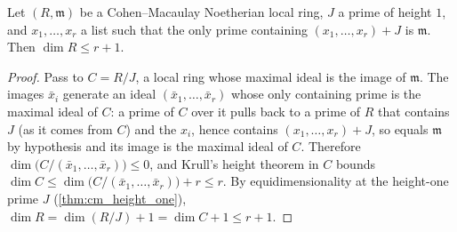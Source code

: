 \begin{theorem}
  \label{thm:krull_codim_count}
  \leanok
  Let \((R, \mathfrak m)\) be a Cohen--Macaulay Noetherian local ring, \(J\) a
  prime of height \(1\), and \(x_1, \dots, x_r\) a list such that the only prime
  containing \((x_1, \dots, x_r) + J\) is \(\mathfrak m\). Then
  \(\dim R \le r + 1\).
\end{theorem}
\begin{proof}
  \leanok
  Pass to \(C = R/J\), a local ring whose maximal ideal is the image of
  \(\mathfrak m\). The images \(\bar x_i\) generate an ideal
  \((\bar x_1, \dots, \bar x_r)\) whose only containing prime is the maximal
  ideal of \(C\): a prime of \(C\) over it pulls back to a prime of \(R\) that
  contains \(J\) (as it comes from \(C\)) and the \(x_i\), hence contains
  \((x_1, \dots, x_r) + J\), so equals \(\mathfrak m\) by hypothesis and its
  image is the maximal ideal of \(C\). Therefore
  \(\dim\bigl(C/(\bar x_1, \dots, \bar x_r)\bigr) \le 0\), and Krull's height
  theorem in \(C\) bounds \(\dim C \le \dim\bigl(C/(\bar x_1, \dots, \bar x_r)\bigr)
  + r \le r\). By equidimensionality at the height-one prime \(J\)
  (\ref{thm:cm_height_one}), \(\dim R = \dim(R/J) + 1 = \dim C + 1 \le r + 1\).
\end{proof}

